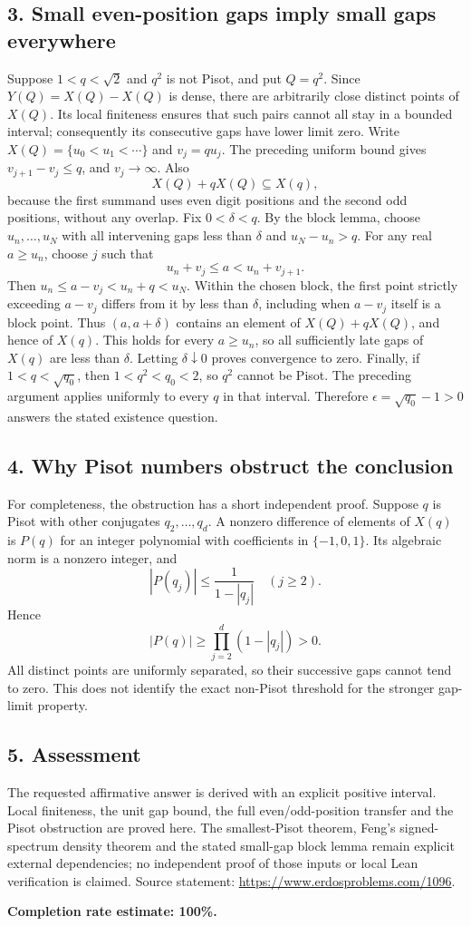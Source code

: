 \subsection*{3. Small even-position gaps imply small gaps everywhere}
Suppose $1<q<\sqrt2$ and $q^2$ is not Pisot, and put $Q=q^2$. Since $Y(Q)=X(Q)-X(Q)$ is dense, there are arbitrarily close distinct points of $X(Q)$. Its local finiteness ensures that such pairs cannot all stay in a bounded interval; consequently its consecutive gaps have lower limit zero.
Write $X(Q)=\{u_0<u_1<\cdots\}$ and $v_j=qu_j$. The preceding uniform bound gives $v_{j+1}-v_j\le q$, and $v_j\to\infty$. Also
\[
 X(Q)+qX(Q)\subseteq X(q),
\]
because the first summand uses even digit positions and the second odd positions, without any overlap.
Fix $0<\delta<q$. By the block lemma, choose $u_n,\ldots,u_N$ with all intervening gaps less than $\delta$ and $u_N-u_n>q$. For any real $a\ge u_n$, choose $j$ such that
\[
 u_n+v_j\le a<u_n+v_{j+1}.
\]
Then $u_n\le a-v_j<u_n+q<u_N$. Within the chosen block, the first point strictly exceeding $a-v_j$ differs from it by less than $\delta$, including when $a-v_j$ itself is a block point. Thus $(a,a+\delta)$ contains an element of $X(Q)+qX(Q)$, and hence of $X(q)$. This holds for every $a\ge u_n$, so all sufficiently late gaps of $X(q)$ are less than $\delta$. Letting $\delta\downarrow0$ proves convergence to zero.
Finally, if $1<q<\sqrt{q_0}$, then $1<q^2<q_0<2$, so $q^2$ cannot be Pisot. The preceding argument applies uniformly to every $q$ in that interval. Therefore $\epsilon=\sqrt{q_0}-1>0$ answers the stated existence question.

\subsection*{4. Why Pisot numbers obstruct the conclusion}
For completeness, the obstruction has a short independent proof. Suppose $q$ is Pisot with other conjugates $q_2,\ldots,q_d$. A nonzero difference of elements of $X(q)$ is $P(q)$ for an integer polynomial with coefficients in $\{-1,0,1\}$. Its algebraic norm is a nonzero integer, and
\[
 |P(q_j)|\le\frac1{1-|q_j|}\quad(j\ge2).
\]
Hence
\[
 |P(q)|\ge\prod_{j=2}^d(1-|q_j|)>0.
\]
All distinct points are uniformly separated, so their successive gaps cannot tend to zero. This does not identify the exact non-Pisot threshold for the stronger gap-limit property.

\subsection*{5. Assessment}
The requested affirmative answer is derived with an explicit positive interval. Local finiteness, the unit gap bound, the full even/odd-position transfer and the Pisot obstruction are proved here. The smallest-Pisot theorem, Feng's signed-spectrum density theorem and the stated small-gap block lemma remain explicit external dependencies; no independent proof of those inputs or local Lean verification is claimed. Source statement: \url{https://www.erdosproblems.com/1096}.

\textbf{Completion rate estimate: 100\%.}
